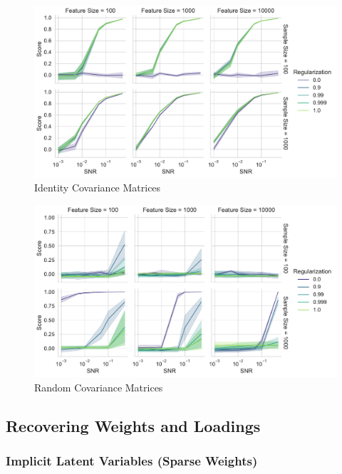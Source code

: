 \begin{figure}
    \centering
    \includegraphics[width=\linewidth]{figures/simulated/snr/snr_vs_scores_facet_identity}
    \caption{Identity Covariance Matrices}\label{fig:snr-scores-identity}
\end{figure}

\begin{figure}
    \centering
    \includegraphics[width=\linewidth]{figures/simulated/snr/snr_vs_scores_facet_random}
    \caption{Random Covariance Matrices}\label{fig:snr-scores-random}
\end{figure}

\subsection{Recovering Weights and Loadings}

\subsubsection{Implicit Latent Variables (Sparse Weights)}

